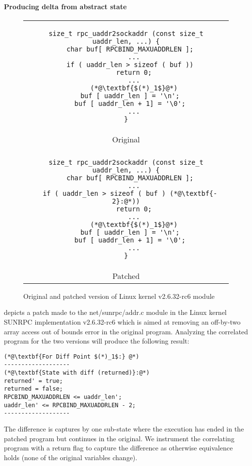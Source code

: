 \paragraph{Producing delta from abstract state}

\begin{figure}
\centering
\begin{tabular}{c}
\begin{lstlisting}
size_t rpc_uaddr2sockaddr (const size_t uaddr_len, ...) {
  char buf[ RPCBIND_MAXUADDRLEN ];
    ...
  if ( uaddr_len > sizeof ( buf ))
    return 0;
    ...
    (*@\textbf{$(*)_1$}@*)
  buf [ uaddr_len ] = '\n';
  buf [ uaddr_len + 1] = '\0';
    ...
}
\end{lstlisting}
\\
Original
\\
\hline
\\
\begin{lstlisting}
size_t rpc_uaddr2sockaddr (const size_t uaddr_len, ...) {
  char buf[ RPCBIND_MAXUADDRLEN ];
    ...
  if ( uaddr_len > sizeof ( buf ) (*@\textbf{- 2}:@*))
    return 0;
    ...
    (*@\textbf{$(*)_1$}@*)
  buf [ uaddr_len ] = '\n';
  buf [ uaddr_len + 1] = '\0';
    ...
}
\end{lstlisting}
\\
Patched
\end{tabular}
\caption{Original and patched version of Linux kernel  v2.6.32-rc6 module}
\end{figure}
 depicts a patch made to the net/sunrpc/addr.c module in the Linux kernel SUNRPC implementation v2.6.32-rc6 which is aimed at removing an off-by-two array access out of bounds error in the original program.  Analyzing the correlated program for the two versions will produce the following result: 
\begin{lstlisting}
(*@\textbf{For Diff Point $(*)_1$:} @*)
-------------------
(*@\textbf{State with diff (returned)}:@*)
returned' = true;
returned = false;
RPCBIND_MAXUADDRLEN <= uaddr_len';
uaddr_len' <= RPCBIND_MAXUADDRLEN - 2;
-------------------
\end{lstlisting}
The difference is captures by one sub-state where the execution has ended in the patched program but continues in the original. We instrument the correlating program with a return flag to capture the difference as otherwise equivalence holds (none of the original variables change).

